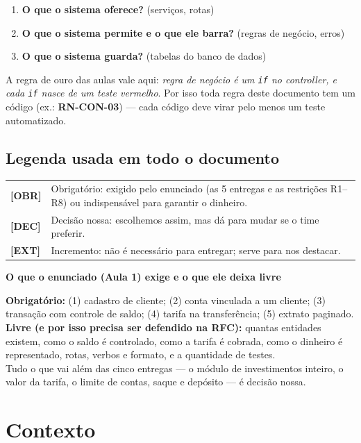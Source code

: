 \documentclass[11pt,a4paper]{article}
\newcommand{\obr}{\textbf{[OBR]}}          %
\newcommand{\dec}{\textbf{[DEC]}}          %
\newcommand{\ext}{\textbf{[EXT]}}          %
\newenvironment{aviso}[1]{%
  \par\medskip\noindent\tabularx{\linewidth}{|X|}\hline
  \textbf{#1}\par\smallskip}{%
  \\\hline\endtabularx\par\medskip}
\begin{document}
\begin{enumerate}
  \item \textbf{O que o sistema oferece?} (serviços, rotas)
  \item \textbf{O que o sistema permite e o que ele barra?} (regras de negócio, erros)
  \item \textbf{O que o sistema guarda?} (tabelas do banco de dados)
\end{enumerate}

A regra de ouro das aulas vale aqui: \emph{regra de negócio é um \texttt{if} no controller, e cada
\texttt{if} nasce de um teste vermelho}. Por isso toda regra deste documento tem um código
(ex.: \textbf{RN-CON-03}) --- cada código deve virar pelo menos um teste automatizado.

\subsection*{Legenda usada em todo o documento}

\begin{tabularx}{\linewidth}{@{}lX@{}}
\obr & Obrigatório: exigido pelo enunciado (as 5 entregas e as restrições R1--R8) ou indispensável para garantir o dinheiro. \\
\dec & Decisão nossa: escolhemos assim, mas dá para mudar se o time preferir. \\
\ext & Incremento: não é necessário para entregar; serve para nos destacar. \\
\end{tabularx}

\begin{aviso}{O que o enunciado (Aula 1) exige e o que ele deixa livre}
\textbf{Obrigatório:} (1) cadastro de cliente; (2) conta vinculada a um cliente; (3) transação com
controle de saldo; (4) tarifa na transferência; (5) extrato paginado.\\
\textbf{Livre (e por isso precisa ser defendido na RFC):} quantas entidades existem, como o saldo é
controlado, como a tarifa é cobrada, como o dinheiro é representado, rotas, verbos e formato, e a
quantidade de testes.\\
Tudo o que vai além das cinco entregas --- o módulo de investimentos inteiro, o valor da tarifa, o
limite de contas, saque e depósito --- é decisão nossa.
\end{aviso}

\section{Contexto}
\end{document}
